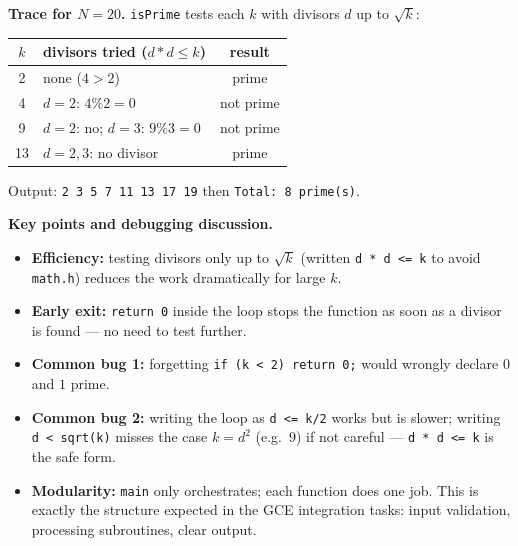 \documentclass[11pt]{article}
\begin{document}
\begin{exoresolu}
\textbf{Trace for $N = 20$.} \texttt{isPrime} tests each $k$ with divisors $d$ up to $\sqrt{k}$:
\begin{center}
\begin{tabular}{|c|l|c|}
\hline
\rowcolor{popblueL} $k$ & divisors tried ($d*d \le k$) & result \\ \hline
2 & none ($4 > 2$) & prime \\ \hline
4 & $d=2$: $4 \% 2 = 0$ & not prime \\ \hline
9 & $d=2$: no; $d=3$: $9 \% 3 = 0$ & not prime \\ \hline
13 & $d=2,3$: no divisor & prime \\ \hline
\end{tabular}
\end{center}
Output: \texttt{2 3 5 7 11 13 17 19} then \texttt{Total: 8 prime(s)}.

\textbf{Key points and debugging discussion.}
\begin{itemize}
\item \textbf{Efficiency:} testing divisors only up to $\sqrt{k}$ (written \texttt{d * d <= k} to avoid \texttt{math.h}) reduces the work dramatically for large $k$.
\item \textbf{Early exit:} \texttt{return 0} inside the loop stops the function as soon as a divisor is found — no need to test further.
\item \textbf{Common bug 1:} forgetting \texttt{if (k < 2) return 0;} would wrongly declare $0$ and $1$ prime.
\item \textbf{Common bug 2:} writing the loop as \texttt{d <= k/2} works but is slower; writing \texttt{d < sqrt(k)} misses the case $k = d^2$ (e.g.\ $9$) if not careful — \texttt{d * d <= k} is the safe form.
\item \textbf{Modularity:} \texttt{main} only orchestrates; each function does one job. This is exactly the structure expected in the GCE integration tasks: input validation, processing subroutines, clear output.
\end{itemize}
\end{exoresolu}
\end{document}

